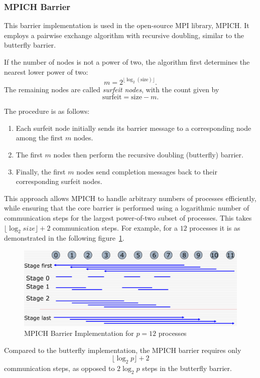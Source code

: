 \documentclass[12pt]{book}
\begin{document}
\subsubsection{MPICH Barrier}
This barrier implementation is used in the open-source MPI library, MPICH. It employs a pairwise exchange algorithm with recursive doubling, similar to the butterfly barrier.

If the number of nodes is not a power of two, the algorithm first determines the nearest lower power of two:
\[
m = 2^{\lfloor \log_2(\text{size}) \rfloor}.
\]
The remaining nodes are called \emph{surfeit nodes}, with the count given by
\[
\text{surfeit} = \text{size} - m.
\]

The procedure is as follows:
\begin{enumerate}
    \item Each surfeit node initially sends its barrier message to a corresponding node among the first $m$ nodes.
    \item The first $m$ nodes then perform the recursive doubling (butterfly) barrier.
    \item Finally, the first $m$ nodes send completion messages back to their corresponding surfeit nodes.
\end{enumerate}

This approach allows MPICH to handle arbitrary numbers of processes efficiently, while ensuring that the core barrier is performed using a logarithmic number of communication steps for the largest power-of-two subset of processes. This takes $\lfloor \log_2 size\rfloor +2$ communication steps. For example, for a $12$ processes it is as demonstrated in the following figure~\ref{fig:MPICHbarrier}.
\begin{figure}
    \centering
    \includegraphics[width=0.75\linewidth]{images/MPICH.png}
    \caption{MPICH Barrier Implementation for $p=12$ processes}
    \label{fig:MPICHbarrier}
\end{figure}
Compared to the butterfly implementation, the MPICH barrier requires only 
\[
\lfloor \log_2 p \rfloor + 2
\]
communication steps, as opposed to $2\log_2 p$ steps in the butterfly barrier. 
\end{document}
